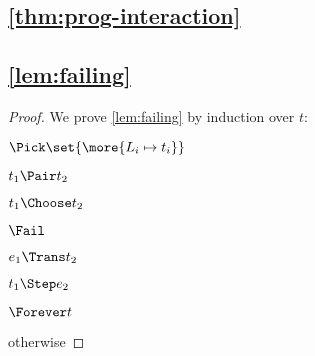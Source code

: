 \subsection{\cref{thm:prog-interaction}}


\subsection{\cref{lem:failing}}

\begin{proof}
    We prove \cref{lem:failing} by induction over $t$:

\case
  {$\Pick \set{\more{L_i \mapsto t_i}}$}
  {}

\case
  {$t_1 \Pair t_2$}
  {}

\case
  {$t_1 \Choose t_2$}
  {}

\case
  {$\Fail$}
  {}

\case
  {$e_1 \Trans t_2$}
  {}

\case
  {$t_1 \Step e_2$}
  {}

\case
  {$\Forever t$}
  {}
  
\case
  {otherwise}
  {}

\end{proof}
